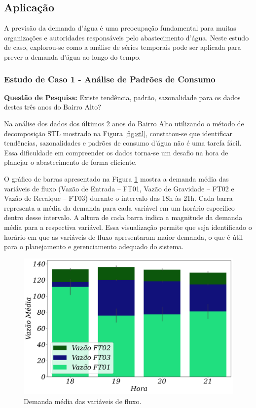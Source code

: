 \subsection{Aplica\c c\~ao}\label{subsec:estudo-reslt}


A previsão da demanda d'água é uma preocupação fundamental para muitas organizações e autoridades responsáveis pelo abastecimento d'água. Neste estudo de caso, explorou-se como a análise de séries temporais pode ser aplicada para prever a demanda d'água ao longo do tempo.


\subsubsection{Estudo de Caso 1 - An\'alise de Padr\~oes de Consumo}\label{subsubsec:quest-est}

\textbf{Questão de Pesquisa:} Existe tendência, padrão, sazonalidade para os dados destes três anos do Bairro Alto?
 
Na análise dos dados dos últimos 2 anos do Bairro Alto utilizando o método de decomposição STL mostrado na Figura \ref{fig:stl}, constatou-se que identificar tendências, sazonalidades e padrões de consumo d'água não é uma tarefa fácil. Essa dificuldade em compreender os dados torna-se um desafio na hora de planejar o abastecimento de forma eficiente.

O gráfico de barras apresentado na Figura \ref{fig:grafico-barras-demanda} mostra a demanda média das variáveis de fluxo (Vazão de Entrada -- FT01, Vazão de Gravidade -- FT02 e Vazão de Recalque -- FT03) durante o intervalo das 18h às 21h. Cada barra representa a média da demanda para cada variável em um horário específico dentro desse intervalo. A altura de cada barra indica a magnitude da demanda média para a respectiva variável. Essa visualização permite que seja identificado o horário em que as variáveis de fluxo apresentaram maior demanda, o que é útil para o planejamento e gerenciamento adequado do sistema.

\begin{figure}[!htb]
	\centering
	\caption{Demanda média das variáveis de fluxo.}
	\includegraphics[width=0.7\linewidth]{Resultados/Figuras/grafico-barras-demanda}
	
	\label{fig:grafico-barras-demanda}
	
	
\end{figure}

